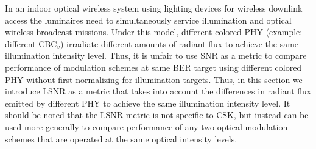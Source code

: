In an indoor optical wireless system using lighting devices for wireless downlink access the luminaires need to simultaneously service illumination and optical wireless broadcast missions. Under this model, different colored PHY (example: different CBC$_{v}$) irradiate different amounts of radiant flux to achieve the same illumination intensity level. Thus, it is unfair to use SNR as a metric to compare performance of modulation schemes at same BER target using different colored PHY without first normalizing for illumination targets. Thus, in this section we introduce LSNR as a metric that takes into account the differences in radiant flux emitted by different PHY to achieve the same illumination intensity level. It should be noted that the LSNR metric is not specific to CSK, but instead can be used more generally to compare performance of any two optical modulation schemes that are operated at the same optical intensity levels.


